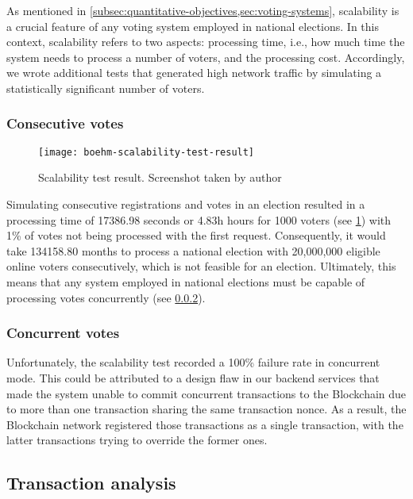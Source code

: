 As mentioned in \cref{subsec:quantitative-objectives,sec:voting-systems}, scalability is a crucial feature of any voting system employed in national elections.
In this context, scalability refers to two aspects: processing time, i.e., how much time the system needs to process a number of voters, and the processing cost.
Accordingly, we wrote additional tests that generated high network traffic by simulating a statistically significant number of voters.


\subsubsection{Consecutive votes}\label{subsubsec:res-consecutive-votes}

\begin{figure}[h]
    \centering
    \texttt{[image: boehm-scalability-test-result]}
    \caption[Scalability test result]{Scalability test result. Screenshot taken by author}
    \label{fig:scalability-test-result}
\end{figure}

Simulating consecutive registrations and votes in an election resulted in a processing time of 17386.98 seconds or 4.83h hours for 1000 voters (see \cref{fig:scalability-test-result}) with 1\% of votes not being processed with the first request.
Consequently, it would take 134158.80 months to process a national election with 20,000,000 eligible online voters consecutively, which is not feasible for an election.
Ultimately, this means that any system employed in national elections must be capable of processing votes concurrently (see \cref{subsubsec:res-concurrent-votes}).

\subsubsection{Concurrent votes}\label{subsubsec:res-concurrent-votes}

Unfortunately, the scalability test recorded a 100\% failure rate in concurrent mode.
This could be attributed to a design flaw in our backend services that made the system unable to commit concurrent transactions to the \gls{Blockchain} due to more than one transaction sharing the same transaction nonce.
As a result, the \gls{Blockchain} network registered those transactions as a single transaction, with the latter transactions trying to override the former ones.

\subsection{Transaction analysis}\label{subsec:res-transaction-analysis}

